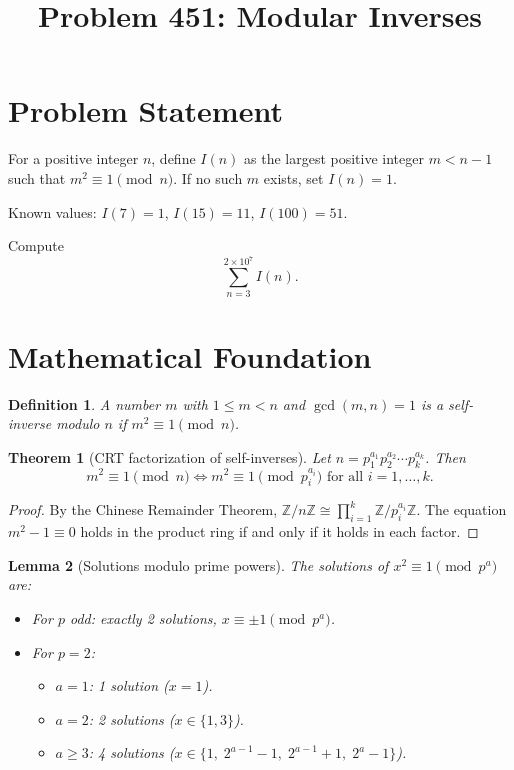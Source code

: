 \documentclass[12pt,a4paper]{article}
\title{Problem 451: Modular Inverses}
\author{}
\date{}
\newtheorem{theorem}{Theorem}
\newtheorem{lemma}[theorem]{Lemma}
\newtheorem{definition}{Definition}
\begin{document}
\maketitle

\section{Problem Statement}

For a positive integer $n$, define $I(n)$ as the largest positive integer $m < n-1$ such that
$m^2 \equiv 1 \pmod{n}$. If no such $m$ exists, set $I(n) = 1$.

Known values: $I(7) = 1$, $I(15) = 11$, $I(100) = 51$.

Compute
\[
    \sum_{n=3}^{2 \times 10^7} I(n).
\]

\section{Mathematical Foundation}

\begin{definition}
A number $m$ with $1 \le m < n$ and $\gcd(m, n) = 1$ is a \emph{self-inverse} modulo $n$ if
$m^2 \equiv 1 \pmod{n}$.
\end{definition}

\begin{theorem}[CRT factorization of self-inverses]\label{thm:crt}
Let $n = p_1^{a_1} p_2^{a_2} \cdots p_k^{a_k}$. Then
\[
    m^2 \equiv 1 \pmod{n} \iff m^2 \equiv 1 \pmod{p_i^{a_i}} \text{ for all } i = 1, \ldots, k.
\]
\end{theorem}

\begin{proof}
By the Chinese Remainder Theorem, $\mathbb{Z}/n\mathbb{Z} \cong \prod_{i=1}^{k} \mathbb{Z}/p_i^{a_i}\mathbb{Z}$. The equation $m^2 - 1 \equiv 0$ holds in the product ring if and only if it holds in each factor.
\end{proof}

\begin{lemma}[Solutions modulo prime powers]\label{lem:pp}
The solutions of $x^2 \equiv 1 \pmod{p^a}$ are:
\begin{itemize}
    \item For $p$ odd: exactly 2 solutions, $x \equiv \pm 1 \pmod{p^a}$.
    \item For $p = 2$:
    \begin{itemize}
        \item $a = 1$: 1 solution ($x = 1$).
        \item $a = 2$: 2 solutions ($x \in \{1, 3\}$).
        \item $a \ge 3$: 4 solutions ($x \in \{1,\; 2^{a-1}-1,\; 2^{a-1}+1,\; 2^a-1\}$).
    \end{itemize}
\end{itemize}
\end{lemma}
\end{document}
